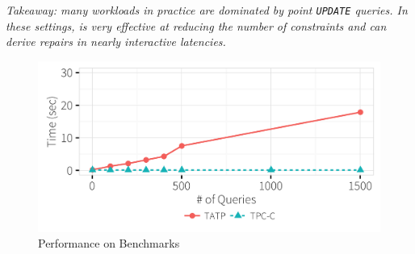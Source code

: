 {\it Takeaway: many workloads in practice are dominated by point \texttt{UPDATE} queries.  In these settings,
 \sys is very effective at reducing the number of constraints and can derive repairs in nearly
 interactive latencies.}
\begin{figure}[h]
\centering
  \includegraphics[width = .75\columnwidth]{figures/benchmark_time}
  \vspace*{-.2in}
  \caption{Performance on Benchmarks}
  \label{f:tpcctatp} 
  \vspace*{-.1in}
\end{figure}

